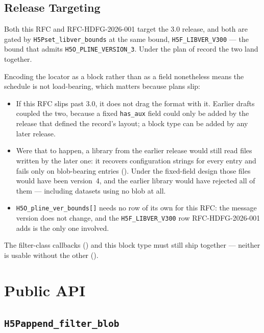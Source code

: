 \documentclass[../RFC-HDFG-2026-003.tex]{subfiles}
\begin{document}
\subsection{Release Targeting}
\label{sec:release-targeting}

Both this RFC and RFC-HDFG-2026-001 target the 3.0 release, and both are
gated by \texttt{H5Pset\_libver\_bounds} at the same bound,
\texttt{H5F\_LIBVER\_V300} --- the bound that admits
\texttt{H5O\_PLINE\_VERSION\_3}.  Under the plan of record the two land
together.

Encoding the locator as a block rather than as a field nonetheless means
the schedule is not load-bearing, which matters because plans slip:

\begin{itemize}
\item If this RFC slips past 3.0, it does not drag the format with it.
  Earlier drafts coupled the two, because a fixed \texttt{has\_aux} field
  could only be added by the release that defined the record's layout; a
  block type can be added by any later release.
\item Were that to happen, a library from the earlier release would still
  read files written by the later one: it recovers configuration strings
  for every entry and fails only on blob-bearing entries
  ().  Under the fixed-field design those files
  would have been version~4, and the earlier library would have rejected
  all of them --- including datasets using no blob at all.
\item \texttt{H5O\_pline\_ver\_bounds[]} needs no row of its own for this RFC:
  the message version does not change, and the
  \texttt{H5F\_LIBVER\_V300} row RFC-HDFG-2026-001 adds is the only one
  involved.
\end{itemize}

The filter-class callbacks () and this
block type must still ship together --- neither is usable without the
other ().


\section{Public API}
\label{sec:public-api}

\subsection{\texttt{H5Pappend\_filter\_blob}}
\label{sec:append-filter-blob}
\end{document}

